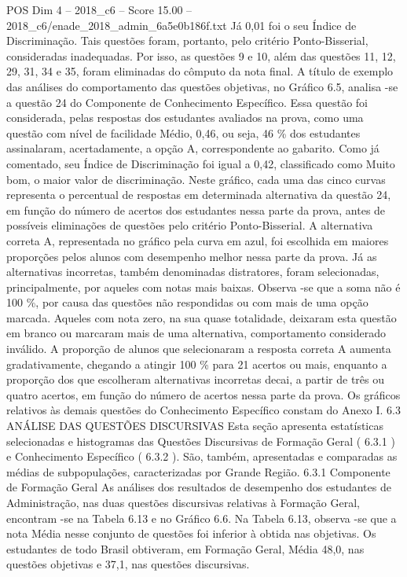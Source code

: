 \begin{textsample}{POS Dim 4 – 2018\_c6 – Score 15.00 – 2018\_c6/enade\_2018\_admin\_6a5e0b186f.txt}
Já 0,01 foi o seu Índice de Discriminação.
Tais questões foram, portanto, pelo critério Ponto-Bisserial, consideradas inadequadas.
Por isso, as questões 9 e 10, além das questões 11, 12, 29, 31, 34 e 35, foram eliminadas do cômputo da nota final.
A título de exemplo das análises do comportamento das questões objetivas, no Gráfico 6.5, analisa -se a questão 24 do Componente de Conhecimento Específico.
Essa questão foi considerada, pelas respostas dos estudantes avaliados na prova, como uma questão com nível de facilidade Médio, 0,46, ou seja, 46 \% dos estudantes assinalaram, acertadamente, a opção A, correspondente ao gabarito.
Como já comentado, seu Índice de Discriminação foi igual a 0,42, classificado como Muito bom, o maior valor de discriminação.
Neste gráfico, cada uma das cinco curvas representa o percentual de respostas em determinada alternativa da questão 24, em função do número de acertos dos estudantes nessa parte da prova, antes de possíveis eliminações de questões pelo critério Ponto-Bisserial.
A alternativa correta A, representada no gráfico pela curva em azul, foi escolhida em maiores proporções pelos alunos com desempenho melhor nessa parte da prova.
Já as alternativas incorretas, também denominadas distratores, foram selecionadas, principalmente, por aqueles com notas mais baixas.
Observa -se que a soma não é 100 \%, por causa das questões não respondidas ou com mais de uma opção marcada.
Aqueles com nota zero, na sua quase totalidade, deixaram esta questão em branco ou marcaram mais de uma alternativa, comportamento considerado inválido.
A proporção de alunos que selecionaram a resposta correta A aumenta gradativamente, chegando a atingir 100 \% para 21 acertos ou mais, enquanto a proporção dos que escolheram alternativas incorretas decai, a partir de três ou quatro acertos, em função do número de acertos nessa parte da prova.
Os gráficos relativos às demais questões do Conhecimento Específico constam do Anexo I. 6.3 ANÁLISE DAS QUESTÕES DISCURSIVAS Esta seção apresenta estatísticas selecionadas e histogramas das Questões Discursivas de Formação Geral ( 6.3.1 ) e Conhecimento Específico ( 6.3.2 ).
São, também, apresentadas e comparadas as médias de subpopulações, caracterizadas por Grande Região. 6.3.1 Componente de Formação Geral As análises dos resultados de desempenho dos estudantes de Administração, nas duas questões discursivas relativas à Formação Geral, encontram -se na Tabela 6.13 e no Gráfico 6.6.
Na Tabela 6.13, observa -se que a nota Média nesse conjunto de questões foi inferior à obtida nas objetivas.
Os estudantes de todo Brasil obtiveram, em Formação Geral, Média 48,0, nas questões objetivas e 37,1, nas questões discursivas.

\end{textsample}
